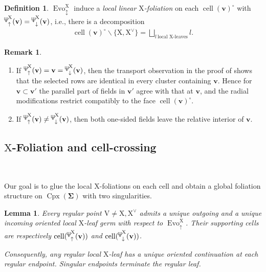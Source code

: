 \documentclass[11pt,reqno]{amsart}
\newcommand{\Neptune}{\mathord{\text{\tikz[baseline=-.5ex,scale=.13]{\draw[line width=.45pt] (0,0)--(0,1.8) (-.6,1.8)--(-.6,.8)--(.6,.8)--(.6,1.8) (-.35,.35)--(.35,.35);}}}}
\theoremstyle{plain}
\newtheorem{lemma}[theorem]{Lemma}
\theoremstyle{definition}
\newtheorem{definition}[theorem]{Definition}
\newtheorem{example}[theorem]{Example}
\newtheorem{remark}[theorem]{Remark}
\numberwithin{equation}{section}
\newcommand\<{\langle}
\renewcommand\>{\rangle}
\newcommand{\on}[1]{\operatorname{#1}}
\def\CCx{\on{Cpx}}   %
\def\cc{\on{cell}}  %
\def\vv{\mathbf{v}}
\def\sink{X}
\newcommand{\flowU}[1]{\on{Evo}_{\uparrow}^{#1}}
\newcommand{\flowDU}[1]{\on{Evo}_{\updownarrow}^{#1}}
\newcommand{\ccpt}[1]{\mathrm{#1}}%
\def\xevo{\ccpt{X}}%
\def\seeds{\mathbf{\Sigma}}
\newcommand{\suppd}[1]{\operatorname{\Neptune}_{\downarrow}^{#1}}
\newcommand{\suppu}[1]{\operatorname{\Neptune}_{\uparrow}^{#1}}
\newcommand{\DT}[1]{#1^{\vee}}
\def\Xevo{\DT{\ccpt{X}}}
\begin{document}
\begin{definition}
$\flowDU{\xevo}$ induce a \emph{local linear $\xevo$-foliation} on each $\cc(\vv)^\circ$ with $\suppu{\xevo}(\vv)=\suppd{\xevo}(\vv)$, i.e., there is a decomposition
\begin{gather}\label{eq:local-foli}
\cc(\vv)^\circ\backslash\{\xevo,\Xevo\}=\bigsqcup_{l~\text{local $\xevo$-leaves}} l.
\end{gather}
\end{definition}

\begin{remark}\label{rem:dege-foli}\
\begin{enumerate}
    \item If $\suppu{\xevo}(\vv)=\vv=\suppd{\xevo}(\vv)$, then the transport observation in the proof of  shows that the selected rows are identical in every cluster containing $\vv$.
    Hence for $\vv\subset\vv'$ the parallel part of fields in $\vv'$ agree with that at $\vv$, and the radial modifications restrict compatibly to the face $\cc(\vv)^\circ$.
    
    \item If $\suppu{\xevo}(\vv)\ne\suppd{\xevo}(\vv)$, then both one-sided fields leave the relative interior of $\vv$.
\end{enumerate}
\end{remark}



\subsection{$\xevo$-Foliation and cell-crossing}\label{sec:Xfoli}\

Our goal is to glue the local $\xevo$-foliations on each cell and obtain a global foliation structure on $\CCx(\seeds)$ with two singularities.

\begin{lemma}\label{lem:c-crossing}
    Every regular point $\ccpt{V}\ne\xevo,\Xevo$ admits a unique outgoing and a unique incoming oriented local $\xevo$-leaf germ with respect to $\flowU{\xevo}$.
    Their supporting cells are respectively $\cc(\suppu{\xevo}(\vv))$ and $\cc(\suppd{\xevo}(\vv))$.

    Consequently, any regular local $\xevo$-leaf has a unique oriented continuation at each regular endpoint. 
    Singular endpoints terminate the regular leaf.
\end{lemma}
\end{document}
